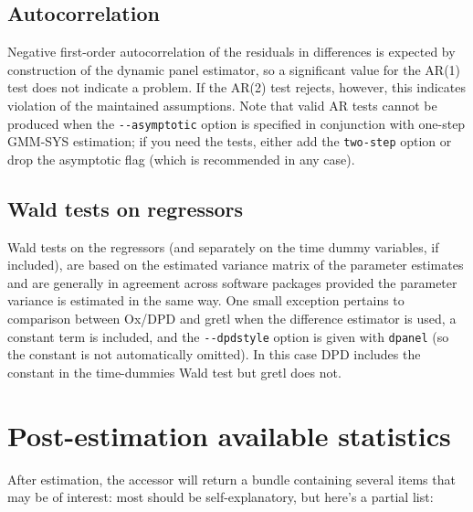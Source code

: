 \subsection{Autocorrelation}

Negative first-order autocorrelation of the residuals in differences
is expected by construction of the dynamic panel estimator, so a
significant value for the AR(1) test does not indicate a problem. If
the AR(2) test rejects, however, this indicates violation of the
maintained assumptions. Note that valid AR tests cannot be produced
when the \verb|--asymptotic| option is specified in conjunction with
one-step GMM-SYS estimation; if you need the tests, either add the
\verb|two-step| option or drop the asymptotic flag (which is
recommended in any case).

\subsection{Wald tests on regressors}

Wald tests on the regressors (and separately on the time dummy
variables, if included), are based on the estimated variance matrix of
the parameter estimates and are generally in agreement across software
packages provided the parameter variance is estimated in the same
way. One small exception pertains to comparison between Ox/DPD and
gretl when the difference estimator is used, a constant term is
included, and the \verb|--dpdstyle| option is given with
\texttt{dpanel} (so the constant is not automatically omitted). In
this case DPD includes the constant in the time-dummies Wald test but
gretl does not.

\section{Post-estimation available statistics}
\label{sec:dpanel-post}

After estimation, the  accessor will return a bundle
containing several items that may be of interest: most should be
self-explanatory, but here's a partial list:

